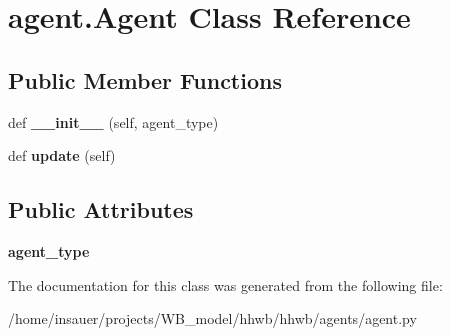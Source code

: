 \hypertarget{classagent_1_1Agent}{}\section{agent.\+Agent Class Reference}
\label{classagent_1_1Agent}
\subsection*{Public Member Functions}
\begin{DoxyCompactItemize}
\item 
\mbox{\label{classagent_1_1Agent_a7ffaa2388d96a499509a7ab3a9e06a5d}} 
def {\bfseries \+\_\+\+\_\+init\+\_\+\+\_\+} (self, agent\+\_\+type)
\item 
\mbox{\label{classagent_1_1Agent_a7e4ea84954bdb61816c715f7bd0c271d}} 
def {\bfseries update} (self)
\end{DoxyCompactItemize}
\subsection*{Public Attributes}
\begin{DoxyCompactItemize}
\item 
\mbox{\label{classagent_1_1Agent_a6d3fc64fc2460eef6855e3601caec937}} 
{\bfseries agent\+\_\+type}
\end{DoxyCompactItemize}


The documentation for this class was generated from the following file\+:\begin{DoxyCompactItemize}
\item 
/home/insauer/projects/\+W\+B\+\_\+model/hhwb/hhwb/agents/agent.\+py\end{DoxyCompactItemize}
